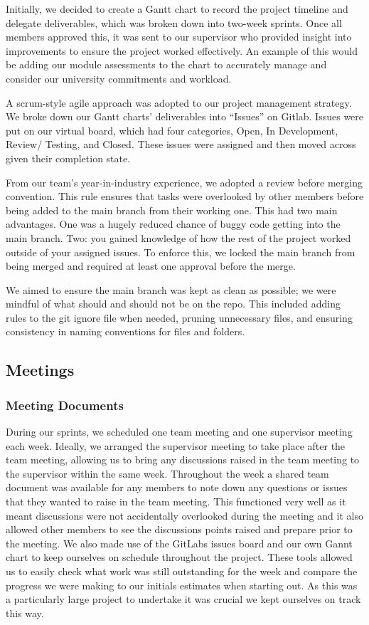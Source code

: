 \documentclass{article}
\begin{document}
    Initially, we decided to create a Gantt chart to record the project timeline and delegate deliverables, which was broken down into two-week sprints. Once all members approved this, it was sent to our supervisor who provided insight into improvements to ensure the project worked effectively. An example of this would be adding our module assessments to the chart to accurately manage and consider our university commitments and workload. 

    A scrum-style agile approach was adopted to our project management strategy. We broke down our Gantt charts’ deliverables into “Issues” on Gitlab. Issues were put on our virtual board, which had four categories, Open, In Development, Review/ Testing, and Closed. These issues were assigned and then moved across given their completion state. 

    From our team’s year-in-industry experience, we adopted a review before merging convention. This rule ensures that tasks were overlooked by other members before being added to the main branch from their working one. This had two main advantages. One was a hugely reduced chance of buggy code getting into the main branch. Two: you gained knowledge of how the rest of the project worked outside of your assigned issues. To enforce this, we locked the main branch from being merged and required at least one approval before the merge.

    We aimed to ensure the main branch was kept as clean as possible; we were mindful of what should and should not be on the repo. This included adding rules to the git ignore file when needed, pruning unnecessary files, and ensuring consistency in naming conventions for files and folders.

\subsection{Meetings}
\subsubsection{Meeting Documents}
During our sprints, we scheduled one team meeting and one supervisor meeting each week. Ideally, we arranged the supervisor meeting to take place after the team meeting, allowing us to bring any discussions raised in the team meeting to the supervisor within the same week.
Throughout the week a shared team document was available for any members to note down any questions or issues that they wanted to raise in the team meeting. This functioned very well as it meant discussions were not accidentally overlooked during the meeting and it also allowed other members to see the discussions points raised and prepare prior to the meeting.
We also made use of the GitLabs issues board and our own Gannt chart to keep ourselves on schedule throughout the project. These tools allowed us to easily check what work was still outstanding for the week and compare the progress we were making to our initials estimates when starting out. As this was a particularly large project to undertake it was crucial we kept ourselves on track this way.
\end{document}

